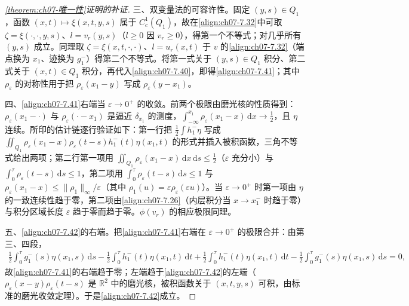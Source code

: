 \documentclass[../../main.tex]{subfiles}%
\begin{document}
\begin{proof}[\cref{theorem:ch07-唯一性}证明的补证]
三、双变量法的可容许性。固定 $(y,s)\in Q_1$，函数 $(x,t)\mapsto\xi(x,t,y,s)$ 属于 $C^1_c(Q_1)$，故在\eqref{align:ch07-7.32}中可取 $\zeta=\xi(\cdot,\cdot,y,s)$、$l=v_r(y,s)$（$l\geqslant0$ 因 $v_r\geqslant0$），得第一个不等式；对几乎所有 $(y,s)$ 成立。同理取 $\zeta=\xi(x,t,\cdot,\cdot)$、$l=u_r(x,t)$ 于 $v$ 的\eqref{align:ch07-7.32}（端点换为 $x_1$、迹换为 $g_1^-$）得第二个不等式。将第一式关于 $(y,s)\in Q_1$ 积分、第二式关于 $(x,t)\in Q_1$ 积分，再代入\eqref{align:ch07-7.40}，即得\eqref{align:ch07-7.41}；其中 $\rho_\varepsilon$ 的对称性用于把 $\rho_\varepsilon(x_1-y)$ 写成 $\rho_\varepsilon(y-x_1)$。

四、\eqref{align:ch07-7.41}右端当 $\varepsilon\to0^+$ 的收敛。前两个极限由磨光核的性质得到：$\rho_\varepsilon(x_1-\cdot)$ 与 $\rho_\varepsilon(\cdot-x_1)$ 是逼近 $\delta_{x_1}$ 的测度，$\int_{-\infty}^{x_1}\rho_\varepsilon(x_1-x)\,\mathrm{d}x\to\frac12$，且 $\eta$ 连续。所印的估计链逐行验证如下：第一行把 $\frac12\int h_1^-\eta$ 写成 $\iint_{Q_1}\rho_\varepsilon(x_1-x)\rho_\varepsilon(t-s)h_1^-(t)\eta(x_1,t)$ 的形式并插入被积函数，三角不等式给出两项；第二行第一项用 $\iint_{Q_1}\rho_\varepsilon(x_1-x)\,\mathrm{d}x\,\mathrm{d}s\leqslant\frac12$（$\varepsilon$ 充分小）与 $\int_0^\tau\rho_\varepsilon(t-s)\,\mathrm{d}s\leqslant1$，第二项用 $\int_0^\tau\rho_\varepsilon(t-s)\,\mathrm{d}s\leqslant1$ 与 $\rho_\varepsilon(x_1-x)\leqslant\|\rho_1\|_\infty/\varepsilon$（其中 $\rho_1(u)=\varepsilon\rho_\varepsilon(\varepsilon u)$）。当 $\varepsilon\to0^+$ 时第一项由 $\eta$ 的一致连续性趋于零，第二项由\eqref{align:ch07-7.26}（内层积分当 $x\to x_1^-$ 时趋于零）与积分区域长度 $\varepsilon$ 趋于零而趋于零。$\phi(v_r)$ 的相应极限同理。

五、\eqref{align:ch07-7.42}的右端。把\eqref{align:ch07-7.41}右端在 $\varepsilon\to0^+$ 的极限合并：由第三、四段，
\begin{align*}
\frac12\int_0^\tau g_1^-(s)\eta(x_1,s)\,\mathrm{d}s-\frac12\int_0^\tau h_1^-(t)\eta(x_1,t)\,\mathrm{d}t
+\frac12\int_0^\tau h_1^-(t)\eta(x_1,t)\,\mathrm{d}t-\frac12\int_0^\tau g_1^-(s)\eta(x_1,s)\,\mathrm{d}s=0,
\end{align*}
故\eqref{align:ch07-7.41}的右端趋于零；左端趋于\eqref{align:ch07-7.42}的左端（$\rho_\varepsilon(x-y)\rho_\varepsilon(t-s)$ 是 $\mathbb{R}^2$ 中的磨光核，被积函数关于 $(x,t,y,s)$ 可积，由标准的磨光收敛定理）。于是\eqref{align:ch07-7.42}成立。


\end{proof}
\end{document}
